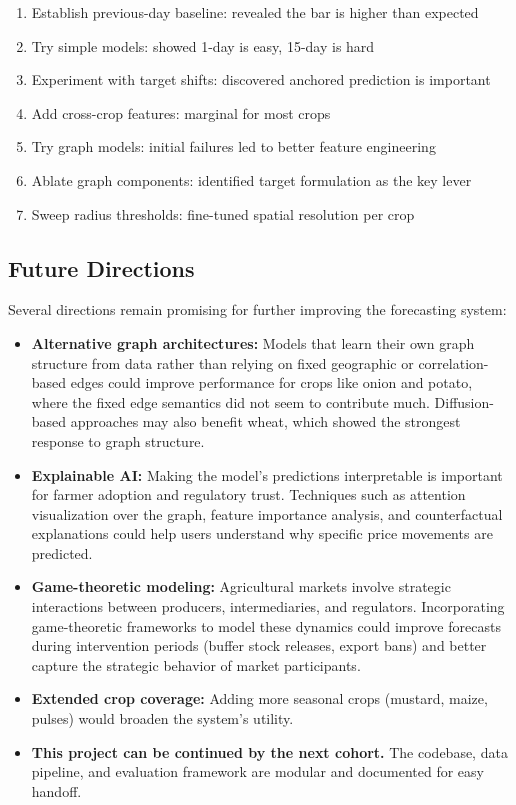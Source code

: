 \documentclass[conference]{IEEEtran}
\begin{document}
\begin{enumerate}
\item Establish previous-day baseline: revealed the bar is higher than expected
\item Try simple models: showed 1-day is easy, 15-day is hard
\item Experiment with target shifts: discovered anchored prediction is important
\item Add cross-crop features: marginal for most crops
\item Try graph models: initial failures led to better feature engineering
\item Ablate graph components: identified target formulation as the key lever
\item Sweep radius thresholds: fine-tuned spatial resolution per crop
\end{enumerate}

\subsection{Future Directions}

Several directions remain promising for further improving the forecasting system:

\begin{itemize}
\item \textbf{Alternative graph architectures:} Models that learn their own graph structure from data rather than relying on fixed geographic or correlation-based edges could improve performance for crops like onion and potato, where the fixed edge semantics did not seem to contribute much. Diffusion-based approaches may also benefit wheat, which showed the strongest response to graph structure.
\item \textbf{Explainable AI:} Making the model's predictions interpretable is important for farmer adoption and regulatory trust. Techniques such as attention visualization over the graph, feature importance analysis, and counterfactual explanations could help users understand why specific price movements are predicted.
\item \textbf{Game-theoretic modeling:} Agricultural markets involve strategic interactions between producers, intermediaries, and regulators. Incorporating game-theoretic frameworks to model these dynamics could improve forecasts during intervention periods (buffer stock releases, export bans) and better capture the strategic behavior of market participants.
\item \textbf{Extended crop coverage:} Adding more seasonal crops (mustard, maize, pulses) would broaden the system's utility.
\item \textbf{This project can be continued by the next cohort.} The codebase, data pipeline, and evaluation framework are modular and documented for easy handoff.
\end{itemize}
\end{document}
